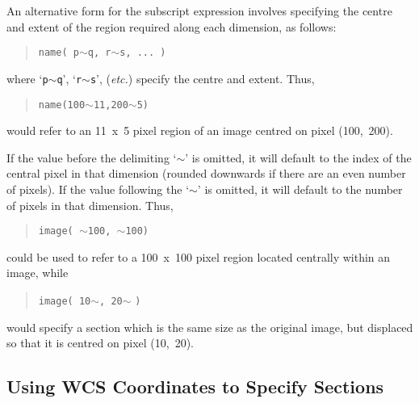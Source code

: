 \documentclass[twoside,11pt,nolof]{starlink}
\providecommand{\st}[1]{{\emph{#1}}}
\providecommand{\hi}[1]{{\texttt{#1}}}
\begin{document}
An alternative form for the subscript expression involves specifying the centre
and extent of the region required along each dimension, as follows:

\small
\begin{quote}
\begin{center}
\hi{name( p}$\sim$\hi{q, r}$\sim$\hi{s, ... )}
\end{center}
\end{quote}
\normalsize

where `\hi{p}$\sim$\hi{q}', `\hi{r}$\sim$\hi{s}', (\st{etc.}) specify the
centre and extent. Thus,

\small
\begin{quote}
\begin{center}
\hi{name(100}$\sim$\hi{11,200}$\sim$\hi{5)}
\end{center}
\end{quote}
\normalsize

would refer to an 11~x~5 pixel region of an image centred on pixel (100,~200).

If the value before the delimiting `$\sim$' is omitted, it will default to the
index of the central pixel in that dimension (rounded downwards if there are an
even number of pixels). If the value following the `$\sim$' is omitted, it will
default to the number of pixels in that dimension. Thus,

\small
\begin{quote}
\begin{center}
\hi{image( }$\sim$\hi{100, }$\sim$\hi{100)}
\end{center}
\end{quote}
\normalsize

could be used to refer to a 100~x~100 pixel region located centrally within an
image, while

\small
\begin{quote}
\begin{center}
\hi{image( 10}$\sim$\hi{, 20}$\sim$ \hi{)}
\end{center}
\end{quote}
\normalsize

would specify a section which is the same size as the original image, but
displaced so that it is centred on pixel (10,~20).

\subsection{\label{ss:axissections}Using
WCS Coordinates to Specify Sections}
\end{document}
